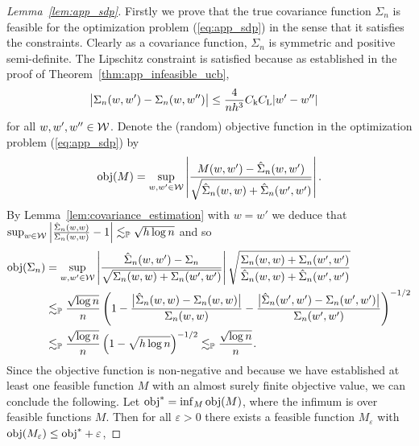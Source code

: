 \begin{proof}[Lemma~\ref{lem:app_sdp}]

  Firstly we prove that the true covariance function
  $\Sigma_n$
  is feasible for the optimization problem
  (\ref{eq:app_sdp}) in the sense that it satisfies the constraints.
  Clearly as a covariance function,
  $\Sigma_n$ is symmetric and positive semi-definite.
  The Lipschitz constraint is satisfied because
  as established in
  the proof of
  Theorem~\ref{thm:app_infeasible_ucb},
  \begin{align*}
    \big|
    \Sigma_n(w,w')
    -
    \Sigma_n(w, w'')
    \big|
    &\leq
    \frac{4}{n h^3}
    C_\mathrm{k}
    C_\mathrm{L}
    |w'-w''|
  \end{align*}
  for all $w,w',w'' \in \mathcal{W}$.
  Denote the (random) objective function
  in the optimization problem (\ref{eq:app_sdp}) by
  \begin{align*}
    \mathrm{obj}(M) = \sup_{w,w' \in \mathcal{W}}
    \left|
    \frac{M(w,w') - \hat\Sigma_n(w,w')}
    {\sqrt{\hat \Sigma_n(w,w) + \hat \Sigma_n(w',w')}}
    \right|.
  \end{align*}
  By Lemma~\ref{lem:covariance_estimation}
  with $w = w'$ we deduce that
  $\sup_{w \in \mathcal{W}}
  \left|\frac{\hat \Sigma_n(w,w)}{\Sigma_n(w,w)} - 1\right|
  \lesssim_{\mathbb{P}} \sqrt{h \log n}$
  and so
  \begin{align*}
    \mathrm{obj}(\Sigma_n)
    &= \sup_{w,w' \in \mathcal{W}}
    \left|
    \frac{\hat\Sigma_n(w,w') - \Sigma_n}
    {\sqrt{\Sigma_n(w,w) + \Sigma_n(w',w')}}
    \right|
    \sqrt{\frac{\Sigma_n(w,w) + \Sigma_n(w',w')}
    {\hat \Sigma_n(w,w) + \hat \Sigma_n(w',w')}} \\
    &\lesssim_{\mathbb{P}}
    \frac{\sqrt{\log n}}{n}
    \left(
      1 - \frac{\big|\hat \Sigma_n(w,w) - \Sigma_n(w,w)\big|}
      {\Sigma_n(w,w)}
      - \frac{\big|\hat \Sigma_n(w',w') - \Sigma_n(w',w')\big|}
      {\Sigma_n(w',w')}
    \right)^{-1/2} \\
    &\lesssim_{\mathbb{P}}
    \frac{\sqrt{\log n}}{n}
    \left(
      1 - \sqrt{h \log n}
    \right)^{-1/2}
    \lesssim_{\mathbb{P}}
    \frac{\sqrt{\log n}}{n}.
  \end{align*}
  Since the objective function
  is non-negative and because we have established
  at least one feasible function $M$ with
  an almost surely finite objective value,
  we can conclude the following.
  Let $\mathrm{obj}^* = \inf_M \mathrm{obj}(M)$,
  where the infimum is over feasible functions $M$.
  Then for all $\varepsilon > 0$
  there exists a feasible function $M_\varepsilon$ with
  $\mathrm{obj}(M_\varepsilon) \leq \mathrm{obj}^* + \varepsilon$,

\end{proof}
